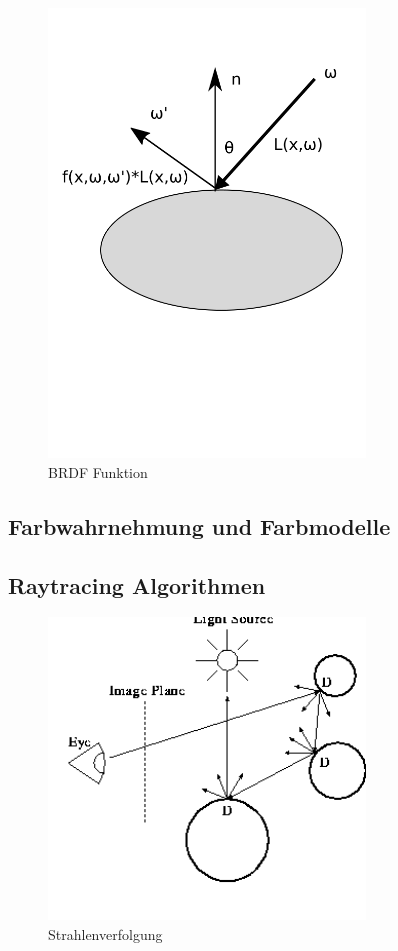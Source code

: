  \begin{figure}[H]
    \centering
    \includegraphics[width=0.75\textwidth]{images/brdf.png}
    \caption{BRDF Funktion}
    \label{fig:raytracin_brdf}
\end{figure}




\subsection{Farbwahrnehmung und Farbmodelle}
\subsection{Raytracing Algorithmen}
 \begin{figure}[H]
    \centering
    \includegraphics[width=0.75\textwidth]{images/rayTracing.png}
    \caption{Strahlenverfolgung}
    \label{fig:diffus}
\end{figure}

